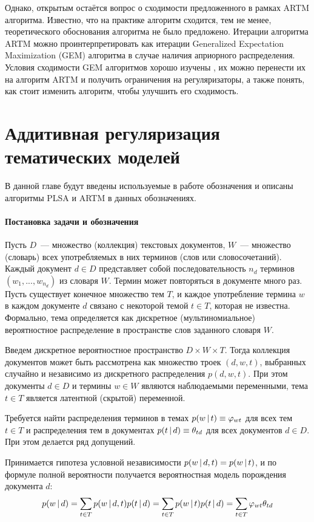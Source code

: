 \documentclass[12pt, twoside]{article}
\begin{document}
Однако, открытым остаётся вопрос о сходимости предложенного в рамках ARTM алгоритма. Известно, что на практике алгоритм сходится, тем не менее, теоретического обоснования алгоритма не было предложено. Итерации алгоритма ARTM можно проинтерпретировать как итерации Generalized Expectation Maximization (GEM) алгоритма \cite{dempster1977maximum} в случае наличия априорного распределения. Условия сходимости GEM алгоритмов хорошо изучены \cite{wu1983convergence}, их можно перенести их на алгоритм ARTM и получить ограничения на регуляризаторы, а также понять, как стоит изменить алгоритм, чтобы улучшить его сходимость.


\section{Аддитивная регуляризация тематических моделей}
В данной главе будут введены используемые в работе обозначения и описаны алгоритмы PLSA и ARTM в данных обозначениях.
\paragraph{Постановка задачи и обозначения}
\label{subsec:denotes}
Пусть $D$~--- множество (коллекция) текстовых документов, $W$~--- множество (словарь) всех употребляемых в них терминов (слов или словосочетаний). Каждый документ $d \in D$ представляет собой последовательность $n_d$ терминов $(w_1, . . . , w_{n_d})$ из словаря $W$. Термин может повторяться в документе много раз. Пусть существует конечное множество тем $T$, и каждое употребление термина $w$ в каждом документе $d$ связано с некоторой темой $t \in T$, которая не известна. Формально, тема определяется как дискретное (мультиномиальное) вероятностное распределение в пространстве слов заданного словаря $W$.

Введем дискретное вероятностное пространство $D \times W \times T$. Тогда коллекция документов может быть рассмотрена как множество троек $(d, w, t)$, выбранных случайно и независимо из дискретного распределения $p(d, w, t)$. При этом документы $d \in D$ и термины $w \in W$ являются наблюдаемыми переменными, тема $t \in T$ является латентной (скрытой) переменной.

Требуется найти распределения терминов в темах $p(w \mspace{3mu}{|}\mspace{3mu} t) \equiv \varphi_{wt}$ для всех тем $t \in T$ и распределения тем в документах $p(t \mspace{3mu}{|}\mspace{3mu} d) \equiv \theta_{td}$ для всех документов $d \in D$. При этом делается ряд допущений.

Принимается гипотеза условной независимости $p(w \mspace{3mu}{|}\mspace{3mu} d,t) = p(w \mspace{3mu}{|}\mspace{3mu} t)$, и  по формуле полной вероятности получается вероятностная модель порождения документа $d$:
\[
p(w \mspace{3mu}{|}\mspace{3mu} d) = \sum_{t \in T} p(w \mspace{3mu}{|}\mspace{3mu} d,t)p(t \mspace{3mu}{|}\mspace{3mu} d) = \sum_{t \in T}p(w \mspace{3mu}{|}\mspace{3mu} t)p(t \mspace{3mu}{|}\mspace{3mu} d)=\sum_{t \in T}\varphi_{wt}\theta_{td}
\]
\end{document}
